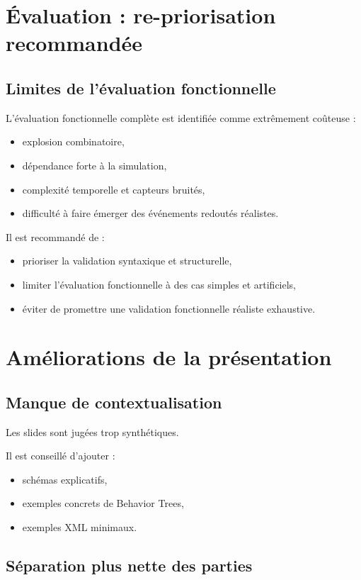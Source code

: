 \documentclass[11pt,a4paper]{article}
\begin{document}
\section{Évaluation : re-priorisation recommandée}

\subsection{Limites de l’évaluation fonctionnelle}

L’évaluation fonctionnelle complète est identifiée comme extrêmement coûteuse :
\begin{itemize}
    \item explosion combinatoire,
    \item dépendance forte à la simulation,
    \item complexité temporelle et capteurs bruités,
    \item difficulté à faire émerger des événements redoutés réalistes.
\end{itemize}

Il est recommandé de :
\begin{itemize}
    \item prioriser la validation syntaxique et structurelle,
    \item limiter l’évaluation fonctionnelle à des cas simples et artificiels,
    \item éviter de promettre une validation fonctionnelle réaliste exhaustive.
\end{itemize}

\section{Améliorations de la présentation}

\subsection{Manque de contextualisation}

Les slides sont jugées trop synthétiques.

Il est conseillé d’ajouter :
\begin{itemize}
    \item schémas explicatifs,
    \item exemples concrets de Behavior Trees,
    \item exemples XML minimaux.
\end{itemize}

\subsection{Séparation plus nette des parties}
\end{document}
